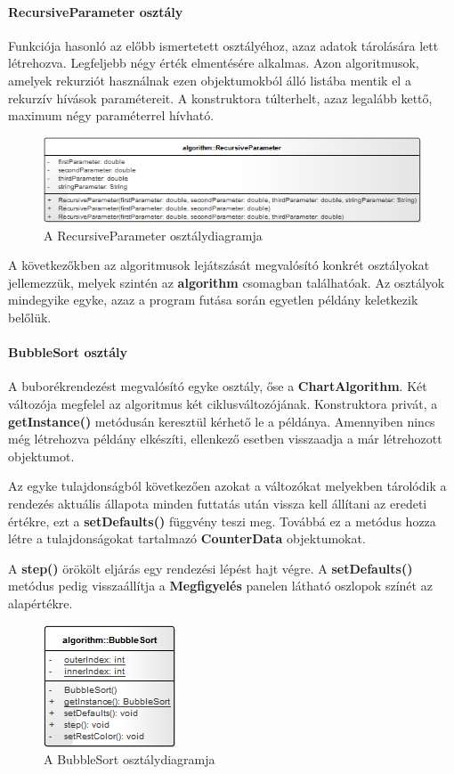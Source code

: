 \documentclass{elteikthesis}
\begin{document}
\paragraph{RecursiveParameter osztály}
Funkciója hasonló az előbb ismertetett osztályéhoz, azaz adatok tárolására lett létrehozva. Legfeljebb négy érték elmentésére alkalmas. Azon algoritmusok, amelyek rekurziót használnak ezen objektumokból álló listába mentik el a rekurzív hívások paramétereit. A konstruktora túlterhelt, azaz legalább kettő, maximum négy paraméterrel hívható.
\begin{figure}[H]
	\centering
	\includegraphics[width=\textwidth]{pics/class/RecursiveParameter.png}
	\caption{A RecursiveParameter osztálydiagramja}
\end{figure}
A következőkben az algoritmusok lejátszását megvalósító konkrét osztályokat jellemezzük, melyek szintén az \textbf{algorithm} csomagban találhatóak. Az osztályok mindegyike egyke, azaz a program futása során egyetlen példány keletkezik belőlük.
\paragraph{BubbleSort osztály}
A buborékrendezést megvalósító egyke osztály, őse a \textbf{ChartAlgorithm}. Két változója megfelel az algoritmus két ciklusváltozójának. Konstruktora privát, a \textbf{getInstance()} metódusán keresztül kérhető le a példánya. Amennyiben nincs még létrehozva példány elkészíti, ellenkező esetben visszaadja a már létrehozott objektumot.\par
Az egyke tulajdonságból következően azokat a változókat melyekben tárolódik a rendezés aktuális állapota minden futtatás után vissza kell állítani az eredeti értékre, ezt a \textbf{setDefaults()} függvény teszi meg. Továbbá ez a metódus hozza létre a tulajdonságokat tartalmazó \textbf{CounterData} objektumokat.\par
A \textbf{step()} örökölt eljárás egy rendezési lépést hajt végre. A \textbf{setDefaults()} metódus pedig visszaállítja a \textbf{Megfigyelés} panelen látható oszlopok színét az alapértékre.
\begin{figure}[H]
	\centering
	\includegraphics{pics/class/BubbleSort.png}
	\caption{A BubbleSort osztálydiagramja}
\end{figure}
\end{document}
